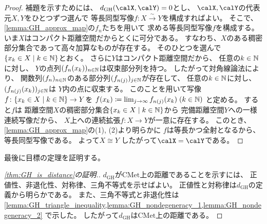 \documentclass[report, notitlepage]{jlreq}
\newcommand{\CMet}{\mathrm{CMet}}
\newcommand{\GH}{\mathrm{GH}}
\begin{document}

\begin{proof}
    補題を示すためには、
    $d_\GH(\calX, \calY) = 0$とし、
    $\calX, \calY$の代表元$X, Y$をひとつずつ選んで
    等長同型写像$f \colon X \stackrel{\sim}{\to} Y$を構成すればよい。
    そこで、\cref{lemma:GH_approx_map}の$f_n$たちを用いて
    求める等長同型写像$f$を構成する。
    いま$X$はコンパクト距離空間だからとくに可分である。
    すなわち、$X$のある稠密部分集合であって高々加算なものが存在する。
    そのひとつを選んで$\{ x_k \in X \mid k \in \mathbb{N} \}$とおく。
    さらに$Y$はコンパクト距離空間だから、
    任意の$k \in \mathbb{N}$に対し、
    $Y$の点列$(f_n(x_k))_{n \in \mathbb{N}}$は収束部分列を持つ。
    したがって対角線論法により、
    関数列$(f_n)_{n \in \mathbb{N}}$のある部分列$(f_{n(j)})_{j \in \mathbb{N}}$が存在して、
    任意の$k \in \mathbb{N}$に対し、
    $(f_{n(j)}(x_k))_{j \in \mathbb{N}}$は
    $Y$内の点に収束する。
    このことを用いて写像
    $f \colon \{ x_k \in X \mid k \in \mathbb{N} \} \to Y$を
    $f(x_k) \coloneqq \lim_{j \to \infty} f_{n(j)}(x_k) \; (k \in \mathbb{N})$
    と定める。
    すると$f$は
    距離空間$X$の稠密部分集合$\{ x_k \in X \mid k \in \mathbb{N} \}$から
    完備距離空間$Y$への一様連続写像だから、
    $X$上への連続拡張$f \colon X \to Y$が一意に存在する。
    このとき、\cref{lemma:GH_approx_map}の(1), (2)より明らかに
    $f$は等長かつ全射となるから、等長同型写像である。
    よって$X \cong Y$
    したがって$\calX = \calY$である。
\end{proof}

最後に目標の定理を証明する。

\begin{proof}[\cref{thm:GH_is_distance}の証明.]
    $d_\GH$が$\CMet$上の距離であることを示すには、
    正値性、非退化性、対称律、三角不等式を示せばよい。
    正値性と対称律は$d_\GH$の定義から明らかである。
    また、三角不等式と非退化性は
    \cref{lemma:GH_triangle_inequality,lemma:GH_nondegeneracy_1,lemma:GH_nondegeneracy_2}
    で示した。
    したがって$d_\GH$は$\CMet$上の距離である。
\end{proof}
\end{document}
